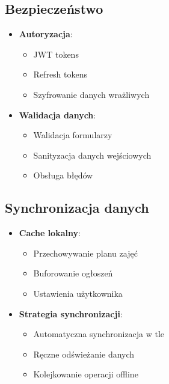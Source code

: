 \subsection{Bezpieczeństwo}

\begin{itemize}
  \item \textbf{Autoryzacja}:
        \begin{itemize}
          \item JWT tokens
          \item Refresh tokens
          \item Szyfrowanie danych wrażliwych
        \end{itemize}

  \item \textbf{Walidacja danych}:
        \begin{itemize}
          \item Walidacja formularzy
          \item Sanityzacja danych wejściowych
          \item Obsługa błędów
        \end{itemize}
\end{itemize}

\subsection{Synchronizacja danych}

\begin{itemize}
  \item \textbf{Cache lokalny}:
        \begin{itemize}
          \item Przechowywanie planu zajęć
          \item Buforowanie ogłoszeń
          \item Ustawienia użytkownika
        \end{itemize}

  \item \textbf{Strategia synchronizacji}:
        \begin{itemize}
          \item Automatyczna synchronizacja w tle
          \item Ręczne odświeżanie danych
          \item Kolejkowanie operacji offline
        \end{itemize}
\end{itemize}
